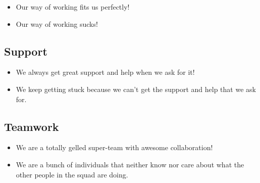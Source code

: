 \documentclass[a4paper]{article}
\begin{document}
\begin{itemize}
\item Our way of working fits us perfectly!
\item Our way of working sucks!
\end{itemize}

\subsection{Support}

\begin{itemize}
\item We always get great support and help when we ask for it!
\item We keep getting stuck because we can't get the support and help that we ask for.
\end{itemize}

\subsection{Teamwork}

\begin{itemize}
\item We are a totally gelled super-team with awesome collaboration!
\item We are a bunch of individuals that neither know nor care about what the other people in the squad are doing.
\end{itemize}
\end{document}
